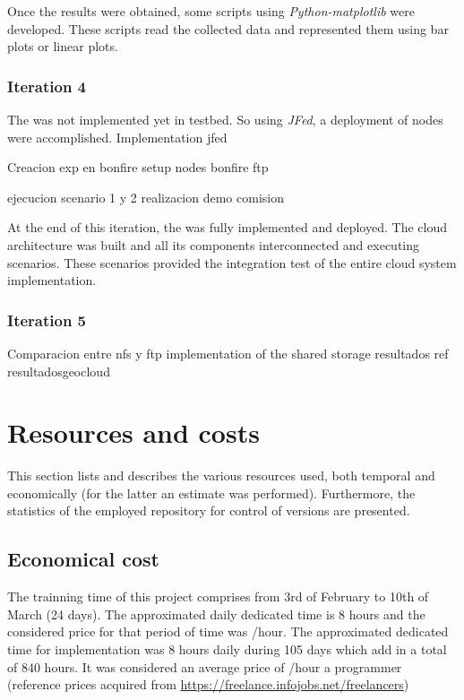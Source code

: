 Once the results were obtained, some scripts using \emph{Python-matplotlib} were
developed. These scripts read the collected data and represented them using bar
plots or linear plots. 

\subsubsection{Iteration 4}

The \sss was not implemented yet in \vw testbed. So using \emph{JFed}, a
deployment of \vw nodes were accomplished. Implementation jfed

Creacion exp en bonfire
setup nodes bonfire ftp

ejecucion scenario 1 y 2
realizacion demo comision

At the end of this iteration, the \sss was fully implemented and deployed. The
cloud architecture was built and all its components interconnected and executing
scenarios. These scenarios provided the integration test of the entire cloud
system implementation.


\subsubsection{Iteration 5}

Comparacion entre nfs y ftp
implementation of the shared storage
resultados ref resultadosgeocloud


\section{Resources and costs}

This section lists and describes the various resources used, both temporal 
and economically (for the latter an estimate was performed). Furthermore, the
statistics of the employed repository for control of versions are presented.

\subsection{Economical cost}

The trainning time of this project comprises from 3rd of February to 10th of
March (24 days). The approximated daily dedicated time is 8 hours and the considered price for that period of time was /hour. The approximated dedicated time for implementation was 8 hours daily
during 105 days which add in a total of 840 hours. It was considered an average
price of /hour a programmer (reference prices acquired from
\url{https://freelance.infojobs.net/freelancers})

